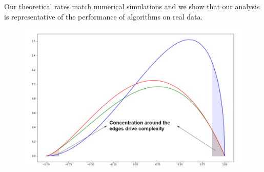 \documentclass{article}
\begin{document}
Our theoretical rates match numerical simulations and we show that our analysis is representative of the performance of algorithms on real data.


\begin{figure}[!htb]
\centering
\begin{minipage}{0.45\textwidth} \vspace{0 pt} %
\includegraphics[width = 1.0 \linewidth]{imgs/concentration.PNG}


\end{minipage}
\end{figure}
\end{document}
